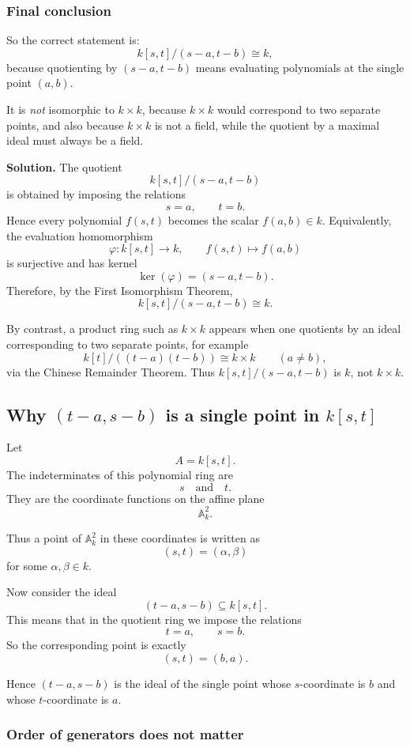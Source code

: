 \documentclass[12pt,a4paper]{article}
\theoremstyle{notespace}
\theoremstyle{definition}
\begin{document}
\subsubsection{Final conclusion}

So the correct statement is:
\[
k[s,t]/(s-a,t-b)\cong k,
\]
because quotienting by \((s-a,t-b)\) means evaluating polynomials at the single point \((a,b)\).

It is \emph{not} isomorphic to \(k\times k\), because \(k\times k\) would correspond to two separate points, and also because \(k\times k\) is not a field, while the quotient by a maximal ideal must always be a field.

\medskip

\textbf{Solution.}
The quotient
\[
k[s,t]/(s-a,t-b)
\]
is obtained by imposing the relations
\[
s=a,\qquad t=b.
\]
Hence every polynomial \(f(s,t)\) becomes the scalar \(f(a,b)\in k\). Equivalently, the evaluation homomorphism
\[
\varphi:k[s,t]\to k,\qquad f(s,t)\mapsto f(a,b)
\]
is surjective and has kernel
\[
\ker(\varphi)=(s-a,t-b).
\]
Therefore, by the First Isomorphism Theorem,
\[
k[s,t]/(s-a,t-b)\cong k.
\]

By contrast, a product ring such as \(k\times k\) appears when one quotients by an ideal corresponding to two separate points, for example
\[
k[t]/((t-a)(t-b))\cong k\times k
\qquad (a\neq b),
\]
via the Chinese Remainder Theorem. Thus \(k[s,t]/(s-a,t-b)\) is \(k\), not \(k\times k\).

\subsection{Why \((t-a,s-b)\) is a single point in \(k[s,t]\)}

Let
\[
A=k[s,t].
\]
The indeterminates of this polynomial ring are
\[
s \quad \text{and} \quad t.
\]
They are the coordinate functions on the affine plane
\[
\mathbb{A}^2_k.
\]

Thus a point of \(\mathbb{A}^2_k\) in these coordinates is written as
\[
(s,t)=(\alpha,\beta)
\]
for some \(\alpha,\beta\in k\).

Now consider the ideal
\[
(t-a,s-b)\subseteq k[s,t].
\]
This means that in the quotient ring we impose the relations
\[
t=a,\qquad s=b.
\]
So the corresponding point is exactly
\[
(s,t)=(b,a).
\]

Hence \((t-a,s-b)\) is the ideal of the single point whose \(s\)-coordinate is \(b\) and whose \(t\)-coordinate is \(a\).

\subsubsection{Order of generators does not matter}
\end{document}
